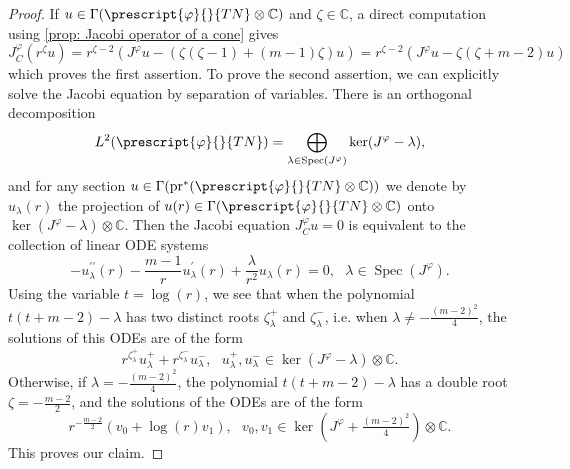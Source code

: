 \documentclass{article}
\numberwithin{equation}{section}        %
\theoremstyle{bfnote}
\theoremstyle{definition}
\theoremstyle{bfremark}
\newcommand{\C}{\mathbb{C}}                 %
\newcommand{\pr}{\mathrm{pr}}               %
\DeclareMathOperator{\Spec}{Spec}               %
\begin{document}
\begin{proof}
    If $u \in \Gamma(\prescript{\varphi}{}{TN} \otimes \C)$ and $\zeta \in \C$, a direct computation using \cref{prop: Jacobi operator of a cone} gives
    \begin{equation*}
        J^\varphi_C(r^\zeta u) = r^{\zeta-2}(J^\varphi u - (\zeta(\zeta-1) + (m-1) \zeta) u) =   r^{\zeta-2} (J^\varphi u - \zeta(\zeta + m -2) u)
    \end{equation*}
    which proves the first assertion. To prove the second assertion, we can explicitly solve the Jacobi equation by separation of variables. There is an orthogonal decomposition 
    \begin{equation*}
        L^2(\prescript{\varphi}{}{TN}) = \bigoplus_{\lambda \in \Spec(J^\varphi)} \ker(J^\varphi - \lambda),
    \end{equation*}
    and for any section $u \in \Gamma(\pr^*(\prescript{\varphi}{}{TN} \otimes \C))$ we denote by $u_\lambda(r)$ the projection of $u(r) \in \Gamma(\prescript{\varphi}{}{TN} \otimes \C)$ onto $\ker(J^\varphi - \lambda) \otimes \C$. Then the Jacobi equation $J^\varphi_C u = 0$ is equivalent to the collection of linear ODE systems
    \begin{equation*}
        - u^{\prime\prime}_\lambda(r) - \frac{m-1}{r} u^\prime_\lambda(r) + \frac{\lambda}{r^2} u_\lambda(r) = 0, ~~~ \lambda \in \Spec(J^\varphi).
    \end{equation*}
    Using the variable $t = \log(r)$, we see that when the polynomial $t(t+m-2) - \lambda$ has two distinct roots $\zeta^+_\lambda$ and $\zeta^-_\lambda$, i.e. when $\lambda \neq - \tfrac{(m-2)^2}{4}$, the solutions of this ODEs are of the form
    \begin{equation*}
        r^{\zeta^+_\lambda} u^+_\lambda + r^{\zeta^-_\lambda} u^-_\lambda, ~~~ u^+_\lambda, u^-_\lambda \in \ker(J^\varphi-\lambda) \otimes \C. 
    \end{equation*}
    Otherwise, if $\lambda = -\tfrac{(m-2)^2}{4}$, the polynomial $t(t+m-2) - \lambda$ has a double root $\zeta = -\tfrac{m-2}{2}$, and the solutions of the ODEs are of the form
    \begin{equation*}
        r^{-\tfrac{m-2}{2}}(v_0 + \log(r) v_1), ~~~ v_0, v_1 \in \ker(J^\varphi + \tfrac{(m-2)^2}{4}) \otimes \C.
    \end{equation*}
    This proves our claim.
\end{proof}
\end{document}
